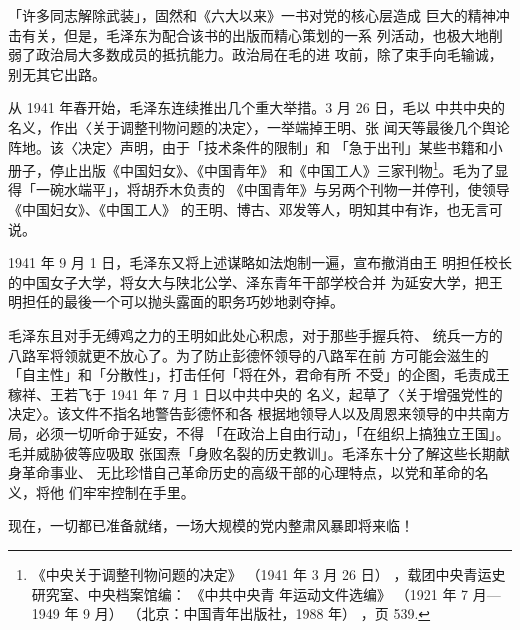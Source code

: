 「许多同志解除武装」，固然和《六大以来》一书对党的核心层造成
巨大的精神冲击有关，但是，毛泽东为配合该书的出版而精心策划的一系
列活动，也极大地削弱了政治局大多数成员的抵抗能力。政治局在毛的进
攻前，除了束手向毛输诚，别无其它出路。

从 1941 年春开始，毛泽东连续推出几个重大举措。3 月 26 日，毛以
中共中央的名义，作出〈关于调整刊物问题的决定〉，一举端掉王明、张
闻天等最後几个舆论阵地。该〈决定〉声明，由于「技术条件的限制」和
「急于出刊」某些书籍和小册子，停止出版《中国妇女》、《中国青年》
和《中国工人》三家刊物\footnote{《中央关于调整刊物问题的决定》
（1941 年 3 月 26 日）
，载团中央青运史研究室、中央档案馆编：
《中共中央青
年运动文件选编》
（1921 年 7 月—1949 年 9 月）
（北京：中国青年出版社，1988 年）
，页 539.}。毛为了显得「一碗水端平」，将胡乔木负责的
《中国青年》与另两个刊物一并停刊，使领导《中国妇女》、《中国工人》
的王明、博古、邓发等人，明知其中有诈，也无言可说。

1941 年 9 月 1 日，毛泽东又将上述谋略如法炮制一遍，宣布撤消由王
明担任校长的中国女子大学，将女大与陕北公学、泽东青年干部学校合并
为延安大学，把王明担任的最後一个可以抛头露面的职务巧妙地剥夺掉。

毛泽东且对手无缚鸡之力的王明如此处心积虑，对于那些手握兵符、
统兵一方的八路军将领就更不放心了。为了防止彭德怀领导的八路军在前
方可能会滋生的「自主性」和「分散性」，打击任何「将在外，君命有所
不受」的企图，毛责成王稼祥、王若飞于 1941 年 7 月 1 日以中共中央的
名义，起草了〈关于增强党性的决定〉。该文件不指名地警告彭德怀和各
根据地领导人以及周恩来领导的中共南方局，必须一切听命于延安，不得
「在政治上自由行动」，「在组织上搞独立王国」。毛并威胁彼等应吸取
张国焘「身败名裂的历史教训」。毛泽东十分了解这些长期献身革命事业、
无比珍惜自己革命历史的高级干部的心理特点，以党和革命的名义，将他
们牢牢控制在手里。

现在，一切都已准备就绪，一场大规模的党内整肃风暴即将来临！
